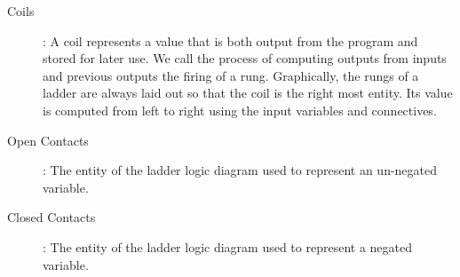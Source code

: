 \begin{comment}
The international standard for programmable logic controllers IEC
61131 \cite{IEC03} describes the graphical language ladder logic. It gets its
name from its graphical ``ladder'' like appearance which was chosen to suit
the control engineers responsible for their design. Each rung of the ladder is
used to compute an output variable from one or more input variables in the rung.
In the railway industry these input variables are referred to as contacts and
the output variables are referred to as coils. A description of the entities representing these variables
is as follows:
\end{comment}

\smallskip

\begin{description}

\item[Coils]: A coil represents a value that is both output from the program and stored for later use.  We call the process of computing outputs from inputs and previous outputs the firing of a rung. Graphically, the rungs of a ladder are always laid out so that the coil is the right most entity. Its value is computed from left to right using the input variables and connectives.

\item[Open Contacts]: The entity of the ladder logic diagram used to represent an un-negated variable.

\item[Closed Contacts]: The entity of the ladder logic diagram used to represent a negated variable.

\begin{comment}
\item[Coils]: These are used to represent values that are both stored for later use
  and output from the program. The value of a coil is calculated when a rung
  fires making use of the current set of inputs, the previous set of outputs
  and any outputs already computed for this cycle. The coil is always the
  right most entity of the rung and its value is computed by executing the
  rung from left to right.


\item[Open Contacts]: This entity represents the value of an un-negated variable


\item[Closed Contacts]: This entity represents the value of a negated variable.
\end{comment}
\end{description}

